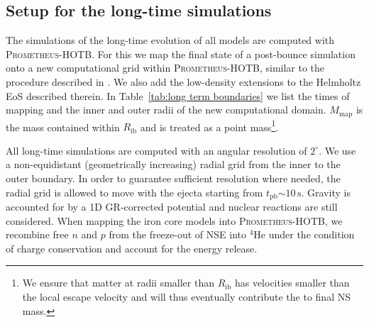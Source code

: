 \documentclass[fleqn,usenatbib]{mnras}
\newcommand{\tpb}{\ensuremath{t_{\text{pb}}}}
\newcommand{\helium}{\ensuremath{\mathrm{^{4}He}}\xspace}
\newcommand{\s}{\ensuremath{\text{s}}}
\newcommand{\prom}{\textsc{Prometheus-HOTB}\xspace}
\begin{document}
\subsection{Setup for the long-time simulations}
\label{Setup during the long-term evolution}
The simulations of the long-time evolution of all models are 
computed with \prom. 
For this we map the final state of a post-bounce simulation onto a 
new computational grid within \prom, similar to the procedure 
described in \cite{Wongwathanarat2015}. We also add the low-density 
extensions to the Helmholtz EoS described therein. In 
Table~\ref{tab:long term boundaries} we list the times of mapping 
and the inner and outer radii of the new computational domain.
$M_{\mathrm{map}}$ is the mass contained within $R_{\mathrm{ib}}$ 
and is treated as a point mass\footnote{We ensure that matter at radii 
smaller than $R_{\mathrm{ib}}$ has velocities smaller than the 
local escape velocity and will thus eventually contribute the to final NS mass.}.

All long-time simulations are computed with an angular 
resolution of $2^{\circ}$. We use a non-equidistant (geometrically 
increasing) radial grid from the inner to the outer boundary. In 
order to guarantee sufficient resolution where needed, the radial 
grid is allowed to move with the ejecta starting from $\tpb\mathord{\sim}10\,\s$. 
Gravity is accounted for by a 1D GR-corrected potential and nuclear reactions 
are still considered. 
When mapping the iron core models into \prom, we recombine free 
$n$ and $p$ from the freeze-out of NSE into \helium under the 
condition of charge conservation and account for the energy release.
\end{document}
